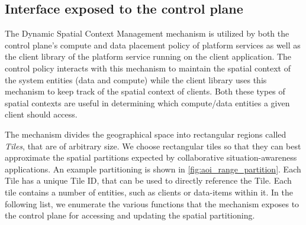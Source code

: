 \subsection{Interface exposed to the control plane}
The Dynamic Spatial Context Management mechanism is utilized by both the control plane's compute and data placement policy of platform services as well as the client library of the platform service running on the client application. The control policy interacts with this mechanism to maintain the spatial context of the system entities (data and compute) while the client library uses this mechanism to keep track of the spatial context of clients. Both these types of spatial contexts are useful in determining which compute/data entities a given client should access. 
\par The mechanism divides the geographical space into rectangular regions called \textit{Tiles}, that are of arbitrary size. We choose rectangular tiles so that they can best approximate the spatial partitions expected by collaborative situation-awareness applications. An example partitioning is shown in \cref{fig:aoi_range_partition}. Each Tile has a unique Tile ID, that can be used to directly reference the Tile. Each tile contains a number of entities, such as clients or data-items within it. In the following list, we enumerate the various functions that the mechanism exposes to the control plane for accessing and updating the spatial partitioning.
